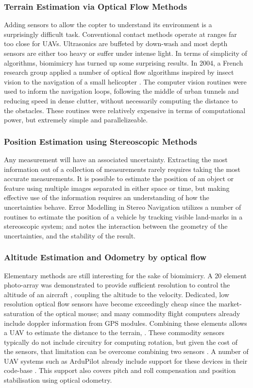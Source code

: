 \documentclass{article}
\begin{document}
      \subsubsection{Terrain Estimation via Optical Flow Methods}
        Adding sensors to allow the copter to understand its environment is a surprisingly difficult task.  Conventional contact methods operate at ranges far too close for UAVs. Ultrasonics are buffeted by down-wash and most depth sensors are either too heavy or suffer under intense light.
        In terms of simplicity of algorithms, biomimicry has turned up some surprising results.  In 2004, a French research group applied a number of optical flow algorithms inspired by insect vision to the navigation of a small helicopter \cite{InsectFlowMethods}.  The computer vision routines were used to inform the navigation loops, following the middle of urban tunnels and reducing speed in dense clutter, without necessarily computing the distance to the obstacles.  These routines were relatively expensive in terms of computational power, but extremely simple and parallelizeable.

      \subsubsection{Position Estimation using Stereoscopic Methods}
        Any measurement will have an associated uncertainty. Extracting the most information out of a collection of measurements rarely requires taking the most accurate measurements.  It is possible to estimate the position of an object or feature using multiple images separated in either space or time, but making effective use of the information requires an understanding of how the uncertainties behave.  Error Modelling in Stereo Navigation \cite{stereoUnc} utilizes a number of routines to estimate the position of a vehicle by tracking visible land-marks in a stereoscopic system; and notes the interaction between the geometry of the uncertainties, and the stability of the result.

      \subsubsection{Altitude Estimation and Odometry by optical flow}
        Elementary methods are still interesting for the sake of biomimicry.  A 20 element photo-array was demonstrated to provide sufficient resolution to control the altitude of an aircraft \cite{optoAlt}, coupling the altitude to the velocity.
        Dedicated, low resolution optical flow sensors have become exceedingly cheap since the market-saturation of the optical mouse; and many commodity flight computers already include doppler information from GPS modules. 
        Combining these elements allows a UAV to estimate the distance to the terrain, \cite{RemTerrain}.  These commodity sensors typically do not include circuitry for computing rotation, but given the cost of the sensors, that limitation can be overcome combining two sensors \cite{FlowRot}.
        A number of UAV systems such as ArduPilot already include support for these devices in their code-base \cite{ArduFlow}.
        This support also covers pitch and roll compensation and position stabilisation using optical odometry.
\end{document}

